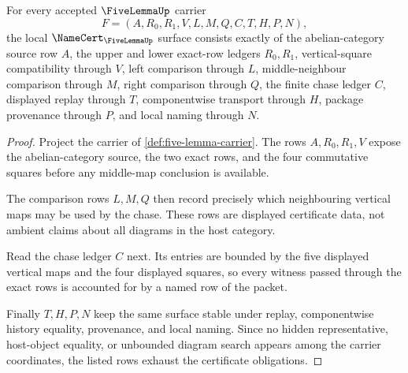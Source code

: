 \begin{theorem}
\label{thm:five-lemma-namecert-obligations}
For every accepted $\FiveLemmaUp$ carrier
$$
F=(A,R_0,R_1,V,L,M,Q,C,T,H,P,N),
$$
the local $\NameCert_{\FiveLemmaUp}$ surface consists exactly of the
abelian-category source row $A$, the upper and lower exact-row ledgers
$R_0,R_1$, vertical-square compatibility through $V$, left comparison through
$L$, middle-neighbour comparison through $M$, right comparison through $Q$, the
finite chase ledger $C$, displayed replay through $T$, componentwise transport
through $H$, package provenance through $P$, and local naming through $N$.
\end{theorem}
\begin{proof}
Project the carrier of \autoref{def:five-lemma-carrier}. The rows
$A,R_0,R_1,V$ expose the abelian-category source, the two exact rows, and the
four commutative squares before any middle-map conclusion is available.

The comparison rows $L,M,Q$ then record precisely which neighbouring vertical
maps may be used by the chase. These rows are displayed certificate data, not
ambient claims about all diagrams in the host category.

Read the chase ledger $C$ next. Its entries are bounded by the five displayed
vertical maps and the four displayed squares, so every witness passed through
the exact rows is accounted for by a named row of the packet.

Finally $T,H,P,N$ keep the same surface stable under replay, componentwise
history equality, provenance, and local naming. Since no hidden representative,
host-object equality, or unbounded diagram search appears among the carrier
coordinates, the listed rows exhaust the certificate obligations.
\end{proof}

